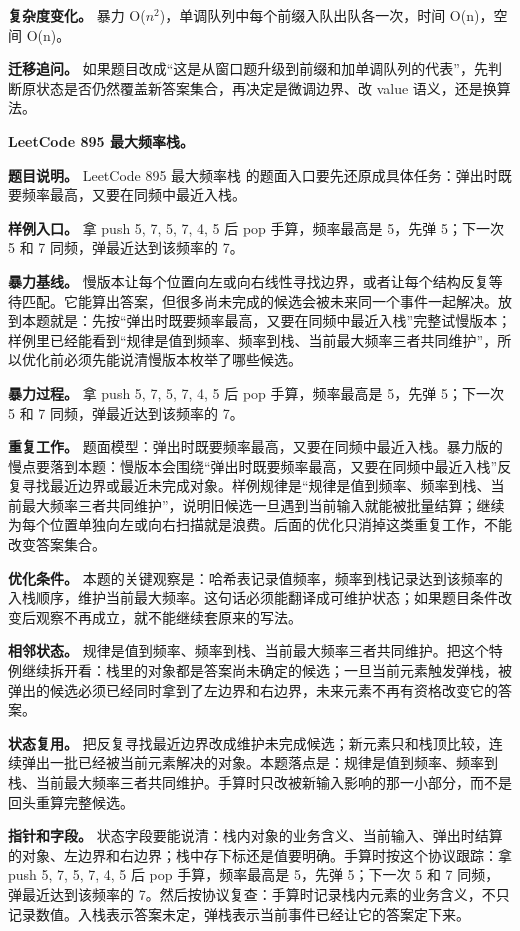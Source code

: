 \textbf{复杂度变化。} 暴力 O(\ensuremath{n^{2}})，单调队列中每个前缀入队出队各一次，时间 O(n)，空间 O(n)。

\textbf{迁移追问。} 如果题目改成“这是从窗口题升级到前缀和加单调队列的代表”，先判断原状态是否仍然覆盖新答案集合，再决定是微调边界、改 value 语义，还是换算法。

\noindent\textbf{LeetCode 895 最大频率栈。}

\textbf{题目说明。} LeetCode 895 最大频率栈 的题面入口要先还原成具体任务：弹出时既要频率最高，又要在同频中最近入栈。

\textbf{样例入口。} 拿 push 5, 7, 5, 7, 4, 5 后 pop 手算，频率最高是 5，先弹 5；下一次 5 和 7 同频，弹最近达到该频率的 7。

\textbf{暴力基线。} 慢版本让每个位置向左或向右线性寻找边界，或者让每个结构反复等待匹配。它能算出答案，但很多尚未完成的候选会被未来同一个事件一起解决。放到本题就是：先按“弹出时既要频率最高，又要在同频中最近入栈”完整试慢版本；样例里已经能看到“规律是值到频率、频率到栈、当前最大频率三者共同维护”，所以优化前必须先能说清慢版本枚举了哪些候选。

\textbf{暴力过程。} 拿 push 5, 7, 5, 7, 4, 5 后 pop 手算，频率最高是 5，先弹 5；下一次 5 和 7 同频，弹最近达到该频率的 7。

\textbf{重复工作。} 题面模型：弹出时既要频率最高，又要在同频中最近入栈。暴力版的慢点要落到本题：慢版本会围绕“弹出时既要频率最高，又要在同频中最近入栈”反复寻找最近边界或最近未完成对象。样例规律是“规律是值到频率、频率到栈、当前最大频率三者共同维护”，说明旧候选一旦遇到当前输入就能被批量结算；继续为每个位置单独向左或向右扫描就是浪费。后面的优化只消掉这类重复工作，不能改变答案集合。

\textbf{优化条件。} 本题的关键观察是：哈希表记录值频率，频率到栈记录达到该频率的入栈顺序，维护当前最大频率。这句话必须能翻译成可维护状态；如果题目条件改变后观察不再成立，就不能继续套原来的写法。

\textbf{相邻状态。} 规律是值到频率、频率到栈、当前最大频率三者共同维护。把这个特例继续拆开看：栈里的对象都是答案尚未确定的候选；一旦当前元素触发弹栈，被弹出的候选必须已经同时拿到了左边界和右边界，未来元素不再有资格改变它的答案。

\textbf{状态复用。} 把反复寻找最近边界改成维护未完成候选；新元素只和栈顶比较，连续弹出一批已经被当前元素解决的对象。本题落点是：规律是值到频率、频率到栈、当前最大频率三者共同维护。手算时只改被新输入影响的那一小部分，而不是回头重算完整候选。

\textbf{指针和字段。} 状态字段要能说清：栈内对象的业务含义、当前输入、弹出时结算的对象、左边界和右边界；栈中存下标还是值要明确。手算时按这个协议跟踪：拿 push 5, 7, 5, 7, 4, 5 后 pop 手算，频率最高是 5，先弹 5；下一次 5 和 7 同频，弹最近达到该频率的 7。然后按协议复查：手算时记录栈内元素的业务含义，不只记录数值。入栈表示答案未定，弹栈表示当前事件已经让它的答案定下来。

